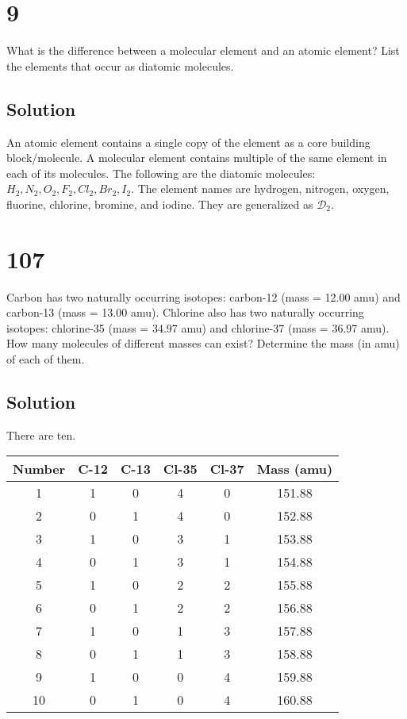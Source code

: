 \documentclass[11pt]{report}
\begin{document}
\section{9}
What is the difference between a molecular element and an atomic element? List the elements that occur as diatomic molecules.

\subsection{Solution}
An atomic element contains a single copy of the element as a core building block/molecule.
A molecular element contains multiple of the same element in each of its molecules. 
The following are the diatomic molecules: $H_2, N_2, O_2, F_2, Cl_2, Br_2, I_2$.
The element names are hydrogen, nitrogen, oxygen, fluorine, chlorine, bromine, and iodine.
They are generalized as $\mathcal{D}_2$.
\pagebreak

\section{107}
Carbon has two naturally occurring isotopes: carbon-12 (mass = 12.00 amu) and carbon-13 (mass = 13.00 amu). Chlorine also has two naturally occurring isotopes: chlorine-35 (mass = 34.97 amu) and chlorine-37 (mass = 36.97 amu). How many  molecules of different masses can exist? Determine the mass (in amu) of each of them.

\subsection{Solution}
There are ten.
\begin{center}
    \begin{tabular}{ c | c | c | c | c | c }
        Number  &C-12   &C-13   &Cl-35  &Cl-37  &Mass (amu)\\
        \hline
        1       &1      &0      &4      &0      &151.88\\
        2       &0      &1      &4      &0      &152.88\\
        3       &1      &0      &3      &1      &153.88\\
        4       &0      &1      &3      &1      &154.88\\
        5       &1      &0      &2      &2      &155.88\\
        6       &0      &1      &2      &2      &156.88\\
        7       &1      &0      &1      &3      &157.88\\
        8       &0      &1      &1      &3      &158.88\\
        9       &1      &0      &0      &4      &159.88\\
        10      &0      &1      &0      &4      &160.88
    \end{tabular}
\end{center}
\end{document}
